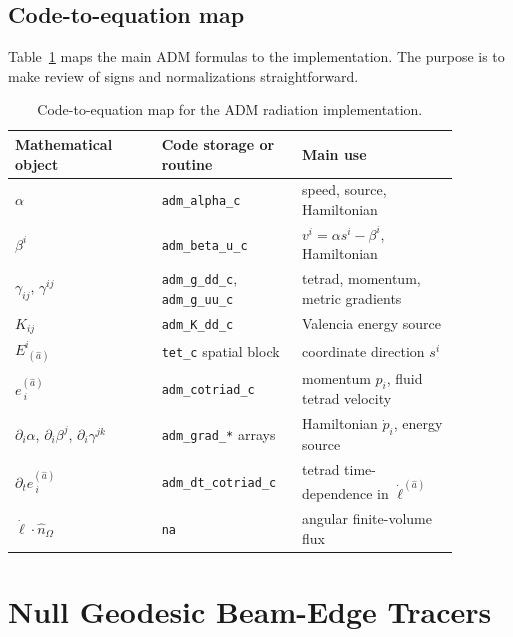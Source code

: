 \documentclass[11pt]{article}
\newcommand{\code}[1]{\texttt{#1}}
\begin{document}
\subsection{Code-to-equation map}

Table~\ref{tab:codemap} maps the main ADM formulas to the implementation.  The
purpose is to make review of signs and normalizations straightforward.

\begin{table}[htbp]
\centering
\small
\begin{tabular}{p{0.30\linewidth}p{0.26\linewidth}p{0.32\linewidth}}
\toprule
Mathematical object & Code storage or routine & Main use \\
\midrule
\(\alpha\) & \code{adm\_alpha\_c} & speed, source, Hamiltonian \\
\(\beta^i\) & \code{adm\_beta\_u\_c} & \(v^i=\alpha s^i-\beta^i\), Hamiltonian \\
\(\gamma_{ij}\), \(\gamma^{ij}\) & \code{adm\_g\_dd\_c}, \code{adm\_g\_uu\_c} & tetrad, momentum, metric gradients \\
\(K_{ij}\) & \code{adm\_K\_dd\_c} & Valencia energy source \\
\(E^i_{\ (\hat a)}\) & \code{tet\_c} spatial block & coordinate direction \(s^i\) \\
\(e^{(\hat a)}_{\ i}\) & \code{adm\_cotriad\_c} & momentum \(p_i\), fluid tetrad velocity \\
\(\partial_i\alpha\), \(\partial_i\beta^j\), \(\partial_i\gamma^{jk}\) & \code{adm\_grad\_*} arrays & Hamiltonian \(\dot p_i\), energy source \\
\(\partial_t e^{(\hat a)}_{\ i}\) & \code{adm\_dt\_cotriad\_c} & tetrad time-dependence in \(\dot\ell^{(\hat a)}\) \\
\(\dot\ell\cdot\hat n_{\Omega}\) & \code{na} & angular finite-volume flux \\
\bottomrule
\end{tabular}
\caption{Code-to-equation map for the ADM radiation implementation.}
\label{tab:codemap}
\end{table}

\section{Null Geodesic Beam-Edge Tracers}
\label{sec:null}
\end{document}
